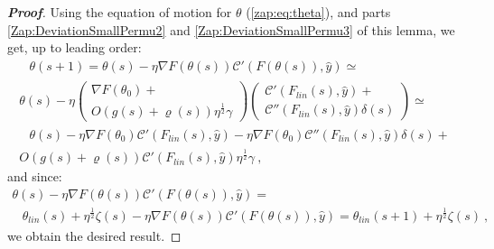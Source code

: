 \documentclass{article} %
\begin{document}
\begin{proof}[\textbf{Proof}]
Using the equation of motion for \(\theta\) (\ref{zap:eq:theta}), and parts \ref{Zap:DeviationSmallPermu2} and \ref{Zap:DeviationSmallPermu3} of this lemma, we get, up to leading order:
\begin{equation}
\begin{array}{c}
\begin{array}{c}
\\
\\
\end{array}\theta\left(s+1\right)=\theta\left(s\right)-\eta\nabla F\left(\theta\left(s\right)\right)\mathcal{C}'\left(F\left(\theta\left(s\right)\right),\hat{y}\right)\simeq\\
\theta\left(s\right)-\eta\left(\begin{array}{c}
\nabla F\left(\theta_{0}\right)+\\
O\left(g\left(s\right)+\varrho\left(s\right)\right)\eta^{\frac{1}{2}}\gamma
\end{array}\right)\left(\begin{array}{c}
\mathcal{C}'\left(F_{lin}\left(s\right),\hat{y}\right)+\\
\mathcal{C}''\left(F_{lin}\left(s\right),\hat{y}\right)\delta\left(s\right)
\end{array}\right)\simeq\\
\begin{array}{c}
\\
\\
\end{array}\theta\left(s\right)-\eta\nabla F\left(\theta_{0}\right)\mathcal{C}'\left(F_{lin}\left(s\right),\hat{y}\right)-\eta\nabla F\left(\theta_{0}\right)\mathcal{C}''\left(F_{lin}\left(s\right),\hat{y}\right)\delta\left(s\right)+\\
O\left(g\left(s\right)+\varrho\left(s\right)\right)\mathcal{C}'\left(F_{lin}\left(s\right),\hat{y}\right)\eta^{\frac{1}{2}}\gamma \ ,
\end{array}
\end{equation}
and since:
\begin{equation}
\begin{array}{c}
\theta\left(s\right)-\eta\nabla F\left(\theta\left(s\right)\right)\mathcal{C}'\left(F\left(\theta\left(s\right)\right),\hat{y}\right)=\\
\begin{array}{c}
\\
\\
\end{array}\theta_{lin}\left(s\right)+\eta^{\frac{1}{2}}\zeta\left(s\right)-\eta\nabla F\left(\theta\left(s\right)\right)\mathcal{C}'\left(F\left(\theta\left(s\right)\right),\hat{y}\right)=\theta_{lin}\left(s+1\right)+\eta^{\frac{1}{2}}\zeta\left(s\right) \ ,
\end{array}
\end{equation}
we obtain the desired result.


\end{proof}
\end{document}
